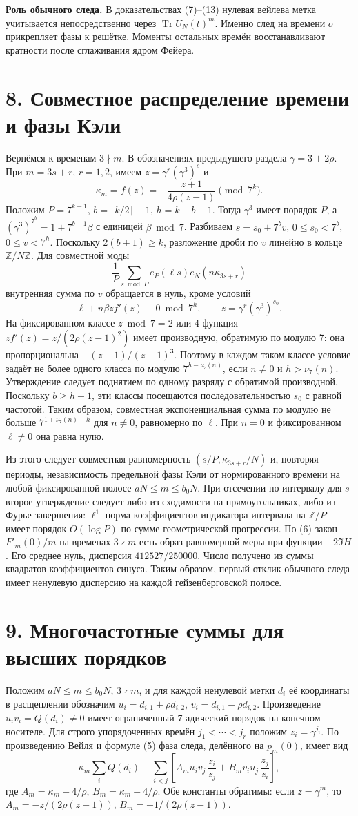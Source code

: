 \documentclass[11pt,a4paper]{article}
\newcommand{\Tr}{\operatorname{Tr}}
\newcommand{\Z}{\mathbb Z}
\newcommand{\sect}[1]{\section*{\sffamily\color{ink}#1}}
\begin{document}
\textbf{Роль обычного следа.} В доказательствах (7)--(13) нулевая вейлева метка учитывается непосредственно через $\Tr U_N(t)^m$. Именно след на времени $o$ прикрепляет фазы к решётке. Моменты остальных времён восстанавливают кратности после сглаживания ядром Фейера.
\newpage
\sect{8. Совместное распределение времени и фазы Кэли}
Вернёмся к временам $3\nmid m$. В обозначениях предыдущего раздела $\gamma=3+2\rho$. При $m=3s+r$, $r=1,2$, имеем $z=\gamma^r(\gamma^3)^s$ и
\[
                    \kappa_m=f(z)=-\frac{z+1}{4\rho(z-1)}
                             \pmod{7^k}.
\]
Положим $P=7^{k-1}$, $b=\lceil k/2\rceil-1$, $h=k-b-1$. Тогда $\gamma^3$ имеет порядок $P$, а $(\gamma^3)^{7^b}=1+7^{b+1}\beta$ с единицей $\beta\bmod7$. Разбиваем $s=s_0+7^b v$, $0\le s_0<7^b$, $0\le v<7^h$. Поскольку $2(b+1)\ge k$, разложение дроби по $v$ линейно в кольце $\Z/N\Z$. Для совместной моды
\[
      \frac1P\sum_{s\bmod P}
                  e_P(\ell s) e_N(n\kappa_{3s+r})
\]
внутренняя сумма по $v$ обращается в нуль, кроме условий
\[
        \ell+n\beta z f'(z)\equiv0\bmod 7^h,\qquad z=\gamma^r(\gamma^3)^{s_0}.
\]
На фиксированном классе $z\bmod7=2$ или 4 функция $z f'(z)=z/(2\rho(z-1)^2)$ имеет производную, обратимую по модулю 7: она пропорциональна $-(z+1)/(z-1)^3$. Поэтому в каждом таком классе условие задаёт не более одного класса по модулю $7^{h-\nu_7(n)}$, если $n\ne0$ и $h>\nu_7(n)$. Утверждение следует поднятием по одному разряду с обратимой производной. Поскольку $b\ge h-1$, эти классы посещаются последовательностью $s_0$ с равной частотой. Таким образом, совместная экспоненциальная сумма по модулю не больше $7^{1+\nu_7(n)-h}$ для $n\ne0$, равномерно по $\ell$. При $n=0$ и фиксированном $\ell\ne0$ она равна нулю.

Из этого следует совместная равномерность $(s/P,\kappa_{3s+r}/N)$ и, повторяя периоды, независимость предельной фазы Кэли от нормированного времени на любой фиксированной полосе $aN\le m\le b_0 N$. При отсечении по интервалу для $s$ второе утверждение следует либо из сходимости на прямоугольниках, либо из Фурье-завершения: $\ell^1$-норма коэффициентов индикатора интервала на $\Z/P$ имеет порядок $O(\log P)$ по сумме геометрической прогрессии. По (6) закон $F'_m(0)/m$ на временах $3\nmid m$ есть образ равномерной меры при функции $-2\Im H$. Его среднее нуль, дисперсия $412527/250000$. Число получено из суммы квадратов коэффициентов синуса. Таким образом, первый отклик обычного следа имеет ненулевую дисперсию на каждой гейзенберговской полосе.
\newpage
\sect{9. Многочастотные суммы для высших порядков}
Положим $aN\le m\le b_0N$, $3\nmid m$, и для каждой ненулевой метки $d_i$ её координаты в расщеплении обозначим $u_i=d_{i,1}+\rho d_{i,2}$, $v_i=d_{i,1}-\rho d_{i,2}$. Произведение $u_iv_i=Q(d_i)\ne0$ имеет ограниченный 7-адический порядок на конечном носителе. Для строго упорядоченных времён $j_1<\cdots<j_r$ положим $z_i=\gamma^{j_i}$. По произведению Вейля и формуле (5) фаза следа, делённого на $p_m(0)$, имеет вид
\[
 \kappa_m\sum_i Q(d_i)+
 \sum_{i<j}\left[
       A_m u_i v_j\,\frac{z_i}{z_j}
        +B_m v_i u_j\,\frac{z_j}{z_i}\right],                       \tag{14}
\]
где $A_m=\kappa_m-\bar4/\rho$, $B_m=\kappa_m+\bar4/\rho$. Обе константы обратимы: если $z=\gamma^m$, то $A_m=-z/(2\rho(z-1))$, $B_m=-1/(2\rho(z-1))$.
\end{document}
